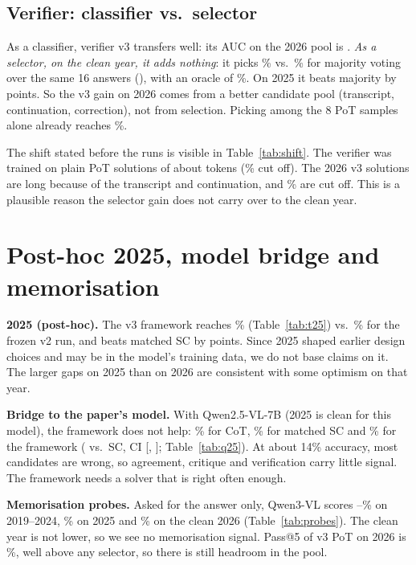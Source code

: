 \documentclass[conference]{IEEEtran}
\begin{document}
\subsection{Verifier: classifier vs.\ selector}\label{sec:ver}

As a classifier, verifier v3 transfers well: its AUC on the 2026 pool is \VerAucTest{}.
\emph{As a selector, on the clean year, it adds nothing}: it picks \ThreePick\% vs.\ \ThreeMaj\%
for majority voting over the same 16 answers (\ThreePickVsMaj), with an oracle of
\ThreeOracle\%. On 2025 it beats majority by \PostPickVsMaj{} points. So the v3 gain on 2026 comes
from a better candidate pool (transcript, continuation, correction), not from selection. Picking
among the 8 PoT samples alone already reaches \ThreePotVer\%.

The shift stated before the runs is visible in Table~\ref{tab:shift}. The verifier was trained on
plain PoT solutions of about \TokTrain{} tokens (\TruncTrain\% cut off). The 2026 v3 solutions are
\TokTest{} long because of the transcript and continuation, and \TruncTest\% are cut off. This is a
plausible reason the selector gain does not carry over to the clean year.



\section{Post-hoc 2025, model bridge and memorisation}

\textbf{2025 (post-hoc).} The v3 framework reaches \PostAcc\% (Table~\ref{tab:t25}) vs.\
\PostTwoAcc\% for the frozen v2 run, and beats matched SC by \PostVsSc{} points. Since 2025 shaped
earlier design choices and may be in the model's training data, we do not base claims on it. The
larger gaps on 2025 than on 2026 are consistent with some optimism on that year.


\textbf{Bridge to the paper's model.} With Qwen2.5-VL-7B (2025 is clean for this model), the
framework does not help: \QBase\% for CoT, \QSc\% for matched SC and \QFull\% for the framework
(\QVsSc{} vs.\ SC, CI [\QVsScLo, \QVsScHi]; Table~\ref{tab:q25}). At about 14\% accuracy, most
candidates are wrong, so agreement, critique and verification carry little signal. The framework
needs a solver that is right often enough.


\textbf{Memorisation probes.} Asked for the answer only, Qwen3-VL scores \ProbeOldLo--\ProbeOldHi\%
on 2019--2024, \ProbeTwentyFive\% on 2025 and \ProbeTwentySix\% on the clean 2026
(Table~\ref{tab:probes}). The clean year is not lower, so we see no memorisation signal. Pass@5 of
v3 PoT on 2026 is \PassFiveThree\%, well above any selector, so there is
still headroom in the pool.
\end{document}
